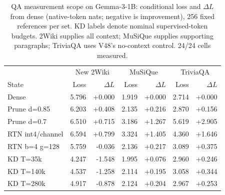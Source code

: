 \begin{table}[H]
\centering
\small
\caption{QA measurement scope on Gemma-3-1B: conditional loss and $\Delta L$ from dense (native-token nats; negative is improvement), 256 fixed references per set. KD labels denote nominal supervised-token budgets. 2Wiki supplies all context; MuSiQue supplies supporting paragraphs; TriviaQA uses V48's no-context control. 24/24 cells measured.}
\label{tab:qa_scope}
\begin{tabular}{lrrrrrr}
\toprule
& \multicolumn{2}{c}{New 2Wiki} & \multicolumn{2}{c}{MuSiQue} & \multicolumn{2}{c}{TriviaQA} \\
State & Loss & $\Delta L$ & Loss & $\Delta L$ & Loss & $\Delta L$ \\
\midrule
Dense & 5.796 & +0.000 & 1.919 & +0.000 & 2.714 & +0.000 \\
Prune d=0.85 & 6.203 & +0.408 & 2.135 & +0.216 & 2.870 & +0.156 \\
Prune d=0.7 & 6.510 & +0.715 & 3.186 & +1.267 & 5.619 & +2.905 \\
RTN int4/channel & 6.594 & +0.799 & 3.324 & +1.405 & 4.360 & +1.646 \\
RTN b=4 g=128 & 5.759 & -0.036 & 2.136 & +0.217 & 3.089 & +0.375 \\
KD T=35k & 4.247 & -1.548 & 1.995 & +0.076 & 2.960 & +0.246 \\
KD T=140k & 4.537 & -1.258 & 2.114 & +0.195 & 3.058 & +0.344 \\
KD T=280k & 4.917 & -0.878 & 2.124 & +0.204 & 2.967 & +0.253 \\
\bottomrule
\end{tabular}
\end{table}
